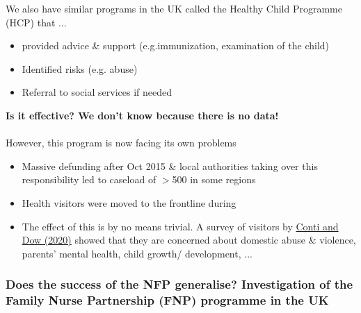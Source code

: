             We also have similar programs in the UK called the Healthy Child Programme (HCP) that ...
            \begin{itemize}
                \item provided advice \& support (e.g.immunization, examination of the child)
                \item Identified risks (e.g. abuse)
                \item Referral to social services if needed
            \end{itemize}
            \textbf{Is it effective? We don't know because there is no data!}
            \\ \\
            However, this program is now facing its own problems
            \begin{itemize}
                \item Massive defunding after Oct 2015 \& local authorities taking over this responsibility
                led to caseload of $>$500 in some regions
                \item Health visitors were moved to the frontline during 
                \item The effect of this is by no means trivial. A survey of visitors by \href{https://discovery.ucl.ac.uk/id/eprint/10106430/8/Conti_Dow_The%20impacts%20of%20COVID-19%20on%20Health%20Visiting%20in%20England%20250920.pdf}{Conti and Dow (2020)} showed that they are concerned about domestic abuse \& violence, parents' mental health, child growth/ development, ...
            \end{itemize}

        \subsubsection{Does the success of the NFP generalise? Investigation of the Family Nurse Partnership (FNP) programme in the UK}
        
